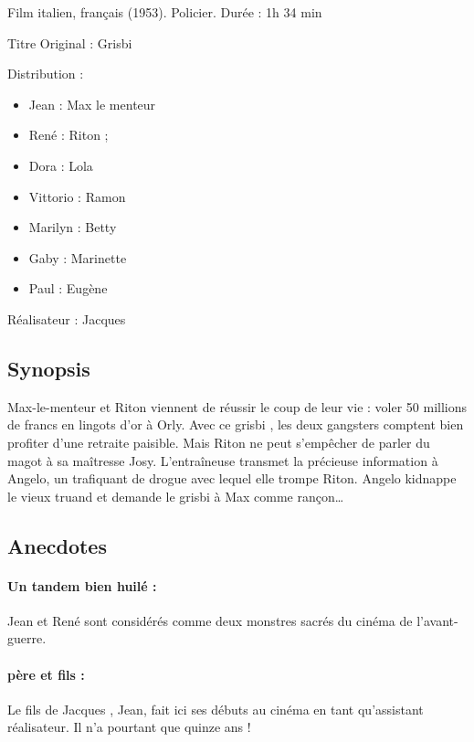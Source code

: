 Film italien, français (1953). Policier. Durée : 1h 34 min

Titre Original : Grisbi

Distribution :

\begin{itemize}
	\item Jean  : Max le menteur	
	\item René  : Riton ;
	\item Dora  : Lola	
	\item Vittorio  : Ramon	
	\item Marilyn  : Betty	
	\item Gaby  : Marinette	
	\item Paul  : Eugène
\end{itemize}

Réalisateur : Jacques 


\subsection*{Synopsis}

Max-le-menteur et Riton viennent de réussir le coup de leur vie : voler 50
millions de francs en lingots d'or à Orly. Avec ce \og grisbi \fg{}, les deux
gangsters comptent bien profiter d'une retraite paisible. Mais Riton ne peut
s'empêcher de parler du magot à sa maîtresse Josy. L'entraîneuse transmet la
précieuse information à Angelo, un trafiquant de drogue avec lequel elle trompe Riton. Angelo kidnappe le vieux truand et demande le \og grisbi \fg{} à Max comme rançon\dots


\subsection*{Anecdotes}

\paragraph{Un tandem bien huilé :} Jean  et René 
 sont considérés comme deux monstres sacrés du cinéma de
l'avant-guerre.

\paragraph{ père et fils :} Le fils de Jacques 
, Jean, fait ici ses débuts au cinéma en tant qu'assistant
réalisateur. Il n'a pourtant que quinze ans !

